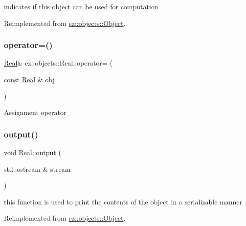 indicates if this object can be used for computation 

Reimplemented from \hyperlink{classez_1_1objects_1_1Object_a19ba1672d4063232c4619e016ca178f8}{ez\+::objects\+::\+Object}.

\mbox{\label{classez_1_1objects_1_1Real_a3931028d4fe7f358321819d38679ebe2}} 
\subsubsection{\texorpdfstring{operator=()}{operator=()}}
{\footnotesize\ttfamily \hyperlink{classez_1_1objects_1_1Real}{Real}\& ez\+::objects\+::\+Real\+::operator= (\begin{DoxyParamCaption}\item[{const \hyperlink{classez_1_1objects_1_1Real}{Real} \&}]{obj }\end{DoxyParamCaption})\hspace{0.3cm}{\ttfamily [inline]}}

Assignment operator \mbox{\label{classez_1_1objects_1_1Real_a337dff4013876656aeb1aa98ecc9864b}} 
\subsubsection{\texorpdfstring{output()}{output()}}
{\footnotesize\ttfamily void Real\+::output (\begin{DoxyParamCaption}\item[{std\+::ostream \&}]{stream }\end{DoxyParamCaption})\hspace{0.3cm}{\ttfamily [virtual]}}

this function is used to print the contents of the object in a serializable manner 

Reimplemented from \hyperlink{classez_1_1objects_1_1Object_a0fdfe18e6c35d6b0d7e7a01265aded15}{ez\+::objects\+::\+Object}.

\mbox{\label{classez_1_1objects_1_1Real_ab41c52af3b10d8cd5190317fc1d70d85}} 
